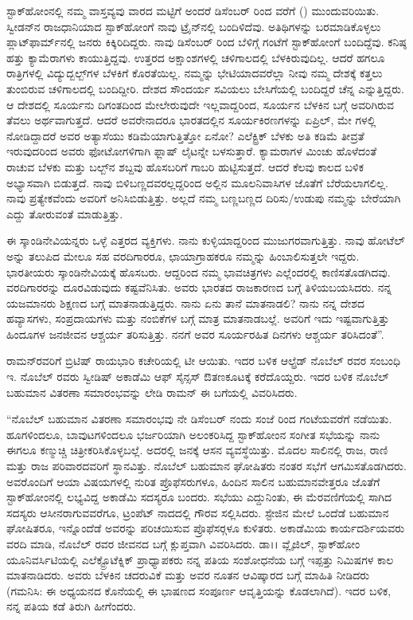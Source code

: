 ಸ್ಟಾಕ್‍ಹೋಂನಲ್ಲಿ ನಮ್ಮ ವಾಸ್ತವ್ಯವು ವಾರದ ಮಟ್ಟಿಗೆ ಅಂದರೆ ಡಿಸೆಂಬರ್  ರಿಂದ  ವರೆಗೆ () ಮುಂದುವರಿಯಿತು. ಸ್ವೀಡನ್‍ನ ರಾಜಧಾನಿಯಾದ ಸ್ಟಾಕ್‍ಹೋಂಗೆ ನಾವು ಟ್ರೈನ್‍ನಲ್ಲಿ ಬಂದಿಳಿದೆವು. ಅತಿಥಿಗಳನ್ನು ಬರಮಾಡಿಕೊಳ್ಳಲು ಪ್ಲಾಟ್‍ಫಾರ್ಮ್‌ನಲ್ಲಿ ಜನರು ಕಿಕ್ಕಿರಿದಿದ್ದರು. ನಾವು ಡಿಸೆಂಬರ್  ರಿಂದ ಬೆಳಿಗ್ಗೆ  ಗಂಟೆಗೆ ಸ್ಟಾಕ್‍ಹೋಂಗೆ ಬಂದಿದ್ದೆವು. ಕನಿಷ್ಠ ಹತ್ತು ಕ್ಯಾಮೆರಾಗಳು ಕಾಯುತ್ತಿದ್ದವು. ಉತ್ತರದ ಅಕ್ಷಾಂಶಗಳಲ್ಲಿ ಚಳಿಗಾಲದಲ್ಲಿ ಬೆಳಕಿರುವುದಿಲ್ಲ. ಆದರೆ ಹಗಲೂ ರಾತ್ರಿಗಳಲ್ಲಿ ವಿದ್ಯುದ್ಬಲ್ಬ್‌ಗಳ ಬೆಳಕಿಗೆ ಕೊರತೆಯಿಲ್ಲ. ನಮ್ಮನ್ನು ಭೇಟಿಯಾದವರೆಲ್ಲಾ ನೀವು ನಮ್ಮ ದೇಶಕ್ಕೆ ಕತ್ತಲು ತುಂಬಿರುವ ಚಳಿಗಾಲದಲ್ಲಿ ಬಂದಿದ್ದೀರಿ. ದೇಶದ ಸೌಂದರ್ಯ ಸವಿಯಲು ಬೇಸಿಗೆಯಲ್ಲಿ ಬಂದಿದ್ದರೆ ಚೆನ್ನ ಎನ್ನುತ್ತಿದ್ದರು. ಆ ದೇಶದಲ್ಲಿ ಸೂರ್ಯನು ದಿಗಂತದಿಂದ ಮೇಲೇರುವುದೇ ಇಲ್ಲವಾದ್ದರಿಂದ, ಸೂರ್ಯನ ಬೆಳಕಿನ ಬಗ್ಗೆ ಅವರಿಗಿರುವ ತೆವಲು ಅರ್ಥವಾಗುತ್ತದೆ. ಆದರೆ ಅವರೇನಾದರೂ ಭಾರತದಲ್ಲಿನ ಸೂರ್ಯಕಿರಣಗಳನ್ನು ಏಪ್ರಿಲ್, ಮೇ ಗಳಲ್ಲಿ ನೋಡಿದ್ದಾದರೆ ಅವರ ಅತ್ಯಾಸೆಯು ಕಡಿಮೆಯಾಗುತ್ತಿತ್ತೋ ಏನೋ? ಎಲೆಕ್ಟ್ರಿಕ್ ಬೆಳಕು ಅತಿ ಕಡಿಮೆ ತೀವ್ರತೆ ಇರುವುದರಿಂದ ಅವರು ಫೋಟೋಗಳಿಗಾಗಿ ಫ್ಲಾಷ್ ಲೈಟನ್ನೇ ಬಳಸುತ್ತಾರೆ. ಕ್ಯಾಮರಾಗಳ ಮಿಂಚು ಹೊಳೆದಂತೆ ರಾಚುವ ಬೆಳಕು ಮತ್ತು ಬಲ್ಬ್‌ನ ಶಬ್ದವು ಹೊಸಬರಿಗೆ ಗಾಬರಿ ಹುಟ್ಟಿಸುತ್ತದೆ. ಆದರೆ ಕೆಲವು ಕಾಲದ ಬಳಿಕ ಅಭ್ಯಾಸವಾಗಿ ಬಿಡುತ್ತದೆ. ನಾವು ಬಿಳಿಬಣ್ಣದವರಲ್ಲದ್ದರಿಂದ ಅಲ್ಲಿನ ಮೂಲನಿವಾಸಿಗಳ ಜೊತೆಗೆ ಬೆರೆಯಲಾಗಲಿಲ್ಲ. ನಾವು ಪ್ರತ್ಯೇಕವೆಂದು ಅವರಿಗೆ ಅನಿಸಿಬಿಡುತ್ತಿತ್ತು. ಅಲ್ಲದೆ ನಮ್ಮ ಬಣ್ಣಬಣ್ಣದ ದಿರಿಸು/ಉಡುಪು ನಮ್ಮನ್ನು ಬೇರೆಯಾಗಿ ಎದ್ದು ತೋರುವಂತೆ ಮಾಡುತ್ತಿತ್ತು.

ಈ ಸ್ಕಾಂಡಿನೇವಿಯನ್ನರು ಒಳ್ಳೆ ಎತ್ತರದ ವ್ಯಕ್ತಿಗಳು. ನಾನು ಕುಳ್ಳಿಯಾದ್ದರಿಂದ ಮುಜುಗರ\-ವಾಗುತ್ತಿತ್ತು. ನಾವು ಹೋಟೆಲ್ ಅನ್ನು ತಲುಪಿದ ಮೇಲೂ ಸಹ ವರದಿಗಾರರೂ, ಛಾಯಾಗ್ರಾಹಕರೂ ನಮ್ಮನ್ನು ಹಿಂಬಾಲಿಸುತ್ತಲೇ ಇದ್ದರು. ಭಾರತೀಯರು ಸ್ಕಾಂಡಿನೇವಿಯಕ್ಕೆ ಹೊಸಬರು. ಆದ್ದರಿಂದ ನಮ್ಮ ಭಾವಚಿತ್ರಗಳು ಎಲ್ಲೆಂದರಲ್ಲಿ ಕಾಣಿಸತೊಡಗಿದವು. ವರದಿಗಾರರನ್ನು ದೂರವಿಡುವುದು ಕಷ್ಟವೆನಿಸಿತು. ಅವರು ಭಾರತದ ರಾಜಕಾರಣದ ಬಗ್ಗೆ ತಿಳಿಯಬಯಸಿದರು. ನನ್ನ ಯಜಮಾನರು ಶಿಕ್ಷಣದ ಬಗ್ಗೆ ಮಾತನಾಡುತ್ತಿದ್ದರು. ನಾನು ಏನು ತಾನೆ ಮಾತನಾಡಲಿ? ನಾನು ನನ್ನ ದೇಶದ ಹವ್ಯಾಸಗಳು, ಸಂಪ್ರದಾಯಗಳು ಮತ್ತು ನಂಬಿಕೆಗಳ ಬಗ್ಗೆ ಮಾತ್ರ ಮಾತನಾಡಬಲ್ಲೆ. ಅವರಿಗೆ ಇದು ಇಷ್ಟವಾಗುತ್ತಿತ್ತು ಹಿಂದೂಗಳ ಜನಜೀವನ ಆಶ್ಚರ್ಯ ತರಿಸುತ್ತಿತ್ತು. ನನಗೆ ಅವರ ಸೂರ್ಯರಹಿತ ದಿನಗಳು ಆಶ್ಚರ್ಯ ತರಿಸಿದಂತೆ”.

ರಾಮನ್‍ರವರಿಗೆ ಬ್ರಿಟಿಷ್ ರಾಯಭಾರಿ ಕಚೇರಿಯಲ್ಲಿ ಟೀ ಆಯಿತು. ಇದರ ಬಳಿಕ ಆಲ್ಫ್ರೆಡ್ ನೊಬೆಲ್ ರವರ ಸಂಬಂಧಿ ಇ. ನೊಬೆಲ್ ರವರು ಸ್ವೀಡಿಷ್ ಅಕಾಡೆಮಿ ಆಫ್ ಸೈನ್ಸಸ್ ಔತಣಕೂಟಕ್ಕೆ ಕರೆದೊಯ್ದರು. ಇದರ ಬಳಿಕ ನೊಬೆಲ್ ಬಹುಮಾನ ವಿತರಣಾ ಸಮಾರಂಭವನ್ನು ಲೇಡಿ ರಾಮನ್ ಈ ಬಗೆಯಲ್ಲಿ ವಿವರಿಸಿದರು.

\enginline{-}“ನೊಬೆಲ್ ಬಹುಮಾನ ವಿತರಣಾ ಸಮಾರಂಭವು ನೇ ಡಿಸೆಂಬರ್ ನಂದು ಸಂಜೆ  ರಿಂದ  ಗಂಟೆಯವರೆಗೆ ನಡೆಯಿತು. ಹೂಗಳಿಂದಲೂ, ಬಾವುಟಗಳಿಂದಲೂ ಭರ್ಜರಿಯಾಗಿ ಅಲಂಕರಿಸಿದ್ದ ಸ್ಟಾಕ್‍ಹೋಂನ ಸಂಗೀತ ಸಭೆಯನ್ನು ನಾನು ಈಗಲೂ ಕಣ್ಮುಚ್ಚಿ ಚಿತ್ರೀಕರಿಸಿಕೊಳ್ಳಬಲ್ಲೆ. ಅದರಲ್ಲಿ  ಜನಕ್ಕೆ ಆಸನ ವ್ಯವಸ್ಥೆಯಿತ್ತು. ಮೊದಲ ಸಾಲಿನಲ್ಲಿ ರಾಜ, ರಾಣಿ ಮತ್ತು ರಾಜ ಪರಿವಾರದವರಿಗೆ ಸ್ಥಾನವಿತ್ತು. ನೊಬೆಲ್ ಬಹುಮಾನ ಘೋಷಿತರು ನಂತರ ಸಭೆಗೆ ಆಗಮಿಸತೊಡಗಿದರು. ಅವರೊಂದಿಗೆ ಆಯಾ ವಿಷಯಗಳಲ್ಲಿ ನುರಿತ ಪ್ರೊಫೆಸರುಗಳೂ, ಹಿಂದಿನ ಸಾಲಿನ ಬಹುಮಾನವೇತ್ತರೂ ಜೊತೆಗೆ ಸ್ಟಾಕ್‍ಹೋಂನಲ್ಲಿ ಲಭ್ಯವಿದ್ದ ಅಕಾಡೆಮಿ ಸದಸ್ಯರೂ ಬಂದರು. ಸಭೆಯು ಎದ್ದುನಿಂತು, ಈ ಮೆರವಣಿಗೆಯಲ್ಲಿ ಸಾಗಿದ ಸದಸ್ಯರು ಆಸೀನರಾಗುವವರೆಗೂ, ಟ್ರಂಪೆಟ್ ನಾದದಲ್ಲಿ ಗೌರವ ಸಲ್ಲಿಸಿದರು. ಸ್ಟೇಜಿನ ಮೇಲೆ ಒಂದೆಡೆ ಬಹುಮಾನ ಘೋಷಿತರೂ, ಇನ್ನೊಂದೆಡೆ ಅವರನ್ನು ಪರಿಚಯಿಸುವ ಪ್ರೊಫೆಸರ್‍ಗಳೂ ಕುಳಿತರು. ಅಕಾಡೆಮಿಯ ಕಾರ್ಯದರ್ಶಿಯವರು ವರದಿ ಮಾಡಿ, ನೊಬೆಲ್ ರವರ ಜೀವನದ ಬಗ್ಗೆ ಕ್ಲುಪ್ತವಾಗಿ ವಿವರಿಸಿದರು. ಡಾ।। ವ್ಲೈಜಿಲ್, ಸ್ಟಾಕ್‍ಹೋಂ ಯೂನಿವರ್ಸಿಟಿಯಲ್ಲಿ ಎಲೆಕ್ಟ್ರೊಟೆಕ್ನಿಕ್ ಪ್ರಾಧ್ಯಾಪಕರು ನನ್ನ ಪತಿಯ ಸಂಶೋಧನೆಯ ಬಗ್ಗೆ ಇಪ್ಪತ್ತು ನಿಮಿಷಗಳ ಕಾಲ ಮಾತನಾಡಿದರು. ಅವರು ಬೆಳಕಿನ ಚದರುವಿಕೆ ಮತ್ತು ಅವರ ನೂತನ ಆವಿಷ್ಕಾರದ ಬಗ್ಗೆ ಮಾಹಿತಿ ನೀಡಿದರು (ಗಮನಿಸಿ: ಈ ಅಧ್ಯಯನದ ಕೊನೆಯಲ್ಲಿ ಈ ಭಾಷಣದ ಸಂಪೂರ್ಣ ಆವೃತ್ತಿಯನ್ನು ಕೊಡಲಾಗಿದೆ). ಇದರ ಬಳಿಕ, ನನ್ನ ಪತಿಯ ಕಡೆ ತಿರುಗಿ ಹೀಗೆಂದರು.

